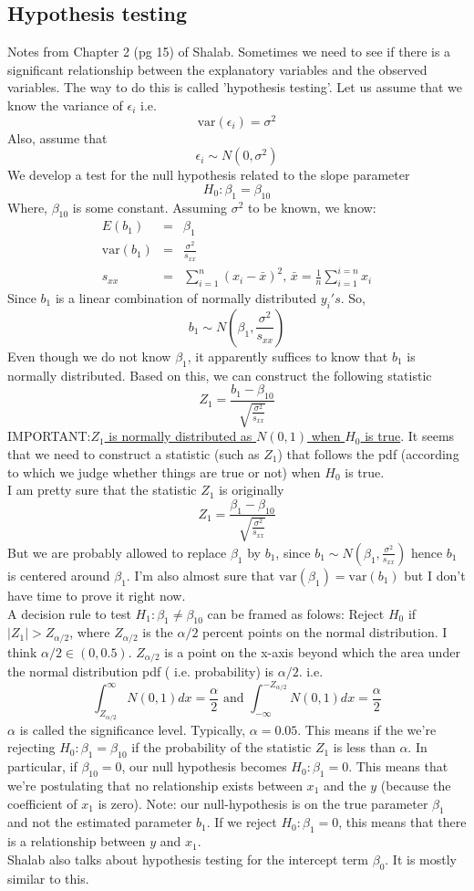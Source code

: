 \documentclass{article}
\newcommand{\beq}{\begin{equation}}
\newcommand{\eeq}{\end{equation}}
\newcommand{\ber}{\begin{eqnarray}}
\newcommand{\eer}{\end{eqnarray}}
\begin{document}
\subsection{Hypothesis testing}
Notes from Chapter 2 (pg 15) of Shalab. Sometimes we need to see if there is a significant relationship between the explanatory variables and the observed variables. The way to do this is called 'hypothesis testing'. Let us assume that we know the variance of $\epsilon_i$ i.e.
\beq
\text{var}(\epsilon_i) = \sigma^2
\eeq
Also, assume that
\beq
\epsilon_i \sim N(0,\sigma^2)
\eeq
We develop a test for the null hypothesis related to the slope parameter
\beq
H_0:\beta_1 = \beta_{10}
\eeq
Where, $\beta_{10}$ is some constant. Assuming $\sigma^2$ to be known, we know:
\ber
E(b_1)&=&\beta_1 \\
\text{var}(b_1) &=& \frac{\sigma^2}{s_{xx}}\\
s_{xx} &=& \sum_{i=1}^{n}(x_i - \bar{x})^2,\,\bar{x} = \frac{1}{n}\sum_{i=1}^{i=n}x_i
\eer
Since $b_1$ is a linear combination of normally distributed $y_i's$. So,
\beq
b_1 \sim N(\beta_1,\frac{\sigma^2}{s_{xx}})  
\eeq
Even though we do not know $\beta_1$, it apparently suffices to know that $b_1$ is normally distributed. Based on this, we can construct the following statistic
\beq
Z_1 = \frac{b_1-\beta_{10}}{\sqrt{\frac{\sigma^2}{s_{xx}}}}
\eeq
IMPORTANT:\underline{$Z_1$ is normally distributed as $N(0,1)$ when $H_0$ is true}. It seems that we need to construct a statistic (such as $Z_1$) that follows the pdf (according to which we judge whether things are true or not) when $H_0$ is true.\\
I am pretty sure that the statistic $Z_1$ is originally 
\beq
Z_1 = \frac{\beta_1-\beta_{10}}{\sqrt{\frac{\sigma^2}{s_{xx}}}}
\eeq
But we are probably allowed to replace $\beta_1$ by $b_1$, since $b_1 \sim N(\beta_1,\frac{\sigma^2}{s_{xx}})$ hence $b_1$ is centered around $\beta_1$. I'm also almost sure that $\text{var}(\beta_1)=\text{var}(b_1)$ but I don't have time to prove it right now.\\
A decision rule to test $H_1:\beta_1 \neq \beta_{10}$ can be framed as folows:
Reject $H_0$ if $|Z_1| > Z_{\alpha/2}$, where $Z_{\alpha/2}$ is the $\alpha/2$ percent points on the normal distribution. I think $\alpha/2 \in(0,0.5)$. $Z_{\alpha/2}$ is a point on the x-axis beyond which the area under the normal distribution pdf ( i.e. probability) is $\alpha/2$. i.e.
\beq
\int_{Z_{\alpha/2}}^{\infty}N(0,1)dx = \frac{\alpha}{2} \text{ and } \int_{-\infty}^{-Z_{\alpha/2}}N(0,1)dx = \frac{\alpha}{2}
\eeq
$\alpha$ is called the significance level. Typically, $\alpha = 0.05$. This means if the we're rejecting $H_0:\beta_1 = \beta_{10}$ if the probability of the statistic $Z_1$ is less than $\alpha$. In particular, if $\beta_{10}=0$, our null hypothesis becomes $H_0:\beta_1 = 0$. This means that we're postulating that no relationship exists between $x_1$ and the $y$ (because the coefficient of $x_1$ is zero). Note: our null-hypothesis is on the true parameter $\beta_1$ and not the estimated parameter $b_1$. If we reject  $H_0:\beta_1 = 0$, this means that there is a relationship between $y$ and $x_1$.\\
Shalab also talks about hypothesis testing for the intercept term $\beta_0$. It is mostly similar to this.
\end{document}
